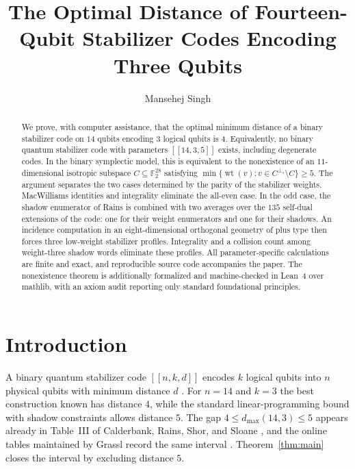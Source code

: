 \documentclass[11pt]{amsart}
\theoremstyle{definition}
\theoremstyle{remark}
\DeclareMathOperator{\wt}{wt}
\newcommand{\F}{\mathbb{F}}
\newcommand{\perps}{{\perp_s}}
\newcommand{\code}[1]{[\![#1]\!]}
\begin{document}
\title[Optimal distance of fourteen-qubit stabilizer codes]
{The Optimal Distance of Fourteen-Qubit Stabilizer Codes Encoding Three Qubits}

\author{Mansehej Singh}
\address{Independent Researcher}

\begin{abstract}
We prove, with computer assistance, that the optimal minimum distance of a
binary stabilizer code on $14$ qubits encoding $3$ logical qubits is $4$.
Equivalently, no binary quantum stabilizer code with parameters
$\code{14,3,5}$ exists, including degenerate codes.  In the binary symplectic
model, this is equivalent to the nonexistence of an $11$-dimensional isotropic
subspace $C\subseteq\F_2^{28}$ satisfying
$\min\{\wt(v):v\in C^{\perps}\setminus C\}\ge 5$.
The argument separates the two cases determined by the parity of the
stabilizer weights.  MacWilliams identities and integrality eliminate the
all-even case.  In the odd case, the shadow enumerator of Rains is combined with
two averages over the $135$ self-dual extensions of the code: one for their
weight enumerators and one for their shadows.  An incidence computation in
an eight-dimensional orthogonal geometry of plus type then forces three
low-weight stabilizer profiles.  Integrality and a collision count among
weight-three shadow words eliminate these profiles.  All parameter-specific
calculations are finite and exact, and reproducible source code accompanies the paper.
The nonexistence theorem is additionally formalized and machine-checked in
Lean~4 over mathlib, with an axiom audit reporting only standard foundational
principles.
\end{abstract}

\maketitle
\pagestyle{plain}

\section{Introduction}\label{sec:intro}

A binary quantum stabilizer code $\code{n,k,d}$ encodes $k$ logical qubits
into $n$ physical qubits with minimum distance $d$
\cite{CRSS1998,Gottesman1997}.  For $n=14$ and $k=3$ the best construction
known has distance $4$, while the standard linear-programming bound with
shadow constraints allows distance $5$.
The gap $4\le d_{\max}(14,3)\le 5$ appears already in Table~III of
Calderbank, Rains, Shor, and Sloane \cite{CRSS1998}, and the online tables
maintained by Grassl record the same interval \cite{Grassl}.
Theorem~\ref{thm:main} closes the interval by excluding distance $5$.
\end{document}

